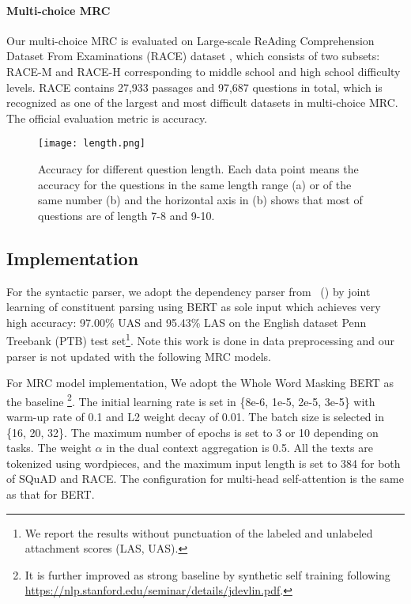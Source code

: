 \documentclass[letterpaper]{article} \usepackage{color}
\begin{document}
\paragraph{Multi-choice MRC}
Our multi-choice MRC is evaluated on Large-scale ReAding Comprehension Dataset From Examinations (RACE) dataset \cite{lai2017race}, which consists of two subsets: RACE-M and RACE-H corresponding to middle school and high school difficulty levels. RACE contains 27,933 passages and 97,687 questions in total, which is recognized as one of the largest and most difficult datasets in multi-choice MRC. The official evaluation metric is accuracy.

\begin{figure*}
	\centering
	\texttt{[image: length.png]}
	\caption{\label{fig:length} Accuracy for different question length. Each data point means the accuracy for the questions in the same length range (a) or of the same number (b) and the horizontal axis in (b) shows that most of questions are of length 7-8 and 9-10.}
\end{figure*}


\subsection{Implementation} 
\label{imp}
For the syntactic parser, we adopt the dependency parser from \citeauthor{zhou2019head}~(\citeyear{zhou2019head}) by joint learning of  constituent parsing \cite{Kitaev-2018-SelfAttentive} using BERT as sole input which achieves very high accuracy: 97.00\% UAS and 95.43\% LAS on the English dataset Penn Treebank (PTB) \cite{MarcusJ93-2004} test set\footnote{We report the results without punctuation of the labeled and unlabeled attachment scores (LAS, UAS).}. Note this work is done in data preprocessing and our parser is not updated with the following MRC models.

For MRC model implementation, We adopt the Whole Word Masking BERT as the baseline \footnote{It is further improved as strong baseline by synthetic self training following \url{https://nlp.stanford.edu/seminar/details/jdevlin.pdf}.}. The initial learning rate is set in \{8e-6, 1e-5, 2e-5, 3e-5\} with warm-up rate of 0.1 and L2 weight decay of 0.01. The batch size is selected in \{16, 20, 32\}. The maximum number of epochs is set to 3 or 10 depending on tasks. The weight $\alpha$ in the dual context aggregation is 0.5. All the texts are tokenized using wordpieces, and the maximum input length is set to 384 for both of SQuAD and RACE. The configuration for multi-head self-attention is the same as that for BERT. 
\end{document}
